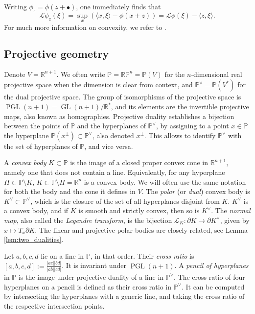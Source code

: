 \documentclass[reqno,10pt]{amsart}
\newcounter{mp}
\DeclareMathOperator{\GL}{GL}
\DeclareMathOperator{\PGL}{PGL}
\newcommand{\R}{\mathbb{R}}
\newcommand{\PP}{\mathbb{P}}
\begin{document}
Writing $\phi_z=\phi(z+\bullet)$, one immediately finds that
$$\mathcal L\phi_z(\xi)=\sup_{x} (\langle x,\xi\rangle-\phi(x+z))=\mathcal L\phi(\xi)-\langle z,\xi\rangle.$$
For much more information on convexity, we refer to \cite{schneider_book}.

\subsection{Projective geometry}
Denote $V=\R^{n+1}$. We often write $\PP=\R\PP^n=\PP(V)$ for the $n$-dimensional real projective space when the dimension is clear from context, and $\PP^\vee=\PP(V^*)$ for the dual projective space. The group of isomorphisms of the projective space is $\PGL(n+1)=\GL(n+1)/\R^*$, and its elements are the invertible projective maps, also known as homographies. 
Projective duality establishes a bijection between the points of $\mathbb P$ and the hyperplanes of $\mathbb P^\vee$, by assigning to a point $x\in\mathbb P$ the hyperplane $\mathbb P(x^\perp)\subset\PP^\vee$, also denoted $x^\perp$. This allows to identify $\PP^\vee$ with the set of hyperplanes of $\PP$, and vice versa.

A \emph{convex body} $K\subset\PP$ is the image of a closed proper convex cone in $\R^{n+1}$, namely one that does not contain a line. 
Equivalently, for any hyperplane $H\subset\PP\setminus K$, $K\subset\PP\setminus H=\R^n$ is a convex body. We will often use the same notation for both the body and the cone it defines in $V$. The \emph{polar} (or \emph{dual}) convex body is $K^\vee\subset\PP^\vee$, which is the closure of the set of all hyperplanes disjoint from $K$. $K^\vee$ is a convex body, and if $K$ is smooth and strictly convex, then so is $K^\vee$. The \emph{normal map}, also called the \emph{Legendre transform}, is the bijection $\mathcal L_K:\partial K\to\partial K^\vee$, given by $x\mapsto T_x\partial K$. The linear and projective polar bodies are closely related, see Lemma \ref{lem:two_dualities}.

Let $a, b, c, d$ lie on a line in $\PP$, in that order. Their \emph{cross ratio} is $[a, b, c, d]:=\frac{|ac||bd|}{|ab||cd|}$. It is invariant under $\PGL(n+1)$. A \emph{pencil of hyperplanes} in $\mathbb P$ is the image under projective duality of a line in $\PP^\vee$. The cross ratio of four hyperplanes on a pencil is defined as their cross ratio in $\PP^\vee$. It can be computed by intersecting the hyperplanes with a generic line, and taking the cross ratio of the respective intersection points.
\end{document}

